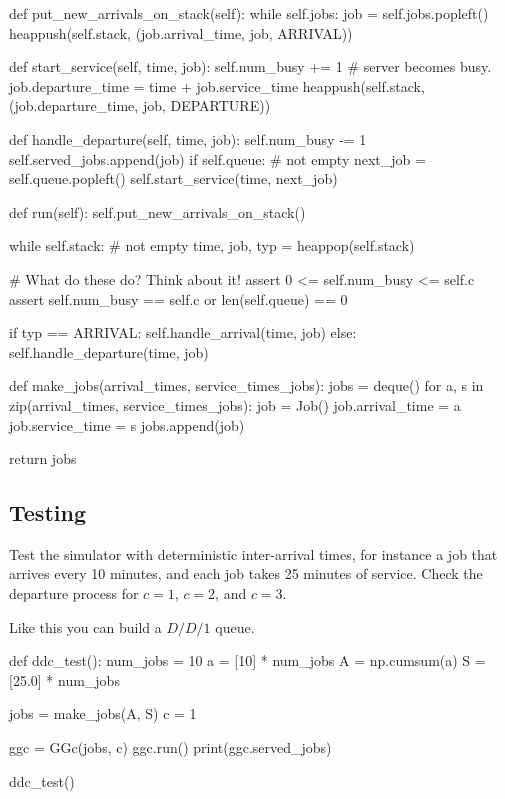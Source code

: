 \begin{exercise}
\begin{solution}
\begin{pyverbatim}
    def put_new_arrivals_on_stack(self):
        while self.jobs:
            job = self.jobs.popleft()
            heappush(self.stack, (job.arrival_time, job, ARRIVAL))

    def start_service(self, time, job):
        self.num_busy += 1  # server becomes busy.
        job.departure_time = time + job.service_time
        heappush(self.stack, (job.departure_time, job, DEPARTURE))

    def handle_departure(self, time, job):
        self.num_busy -= 1
        self.served_jobs.append(job)
        if self.queue:  # not empty
            next_job = self.queue.popleft()
            self.start_service(time, next_job)

    def run(self):
        self.put_new_arrivals_on_stack()

        while self.stack:  # not empty
            time, job, typ = heappop(self.stack)

            # What do these do? Think about it!
            assert 0 <= self.num_busy <= self.c
            assert self.num_busy == self.c or len(self.queue) == 0

            if typ == ARRIVAL:
                self.handle_arrival(time, job)
            else:
                self.handle_departure(time, job)


def make_jobs(arrival_times, service_times_jobs):
    jobs = deque()
    for a, s in zip(arrival_times, service_times_jobs):
        job = Job()
        job.arrival_time = a
        job.service_time = s
        jobs.append(job)

    return jobs
\end{pyverbatim}
\end{solution}
\end{exercise}


\subsection{Testing}
\label{sec:testing-1}

\begin{exercise}
Test the simulator with deterministic inter-arrival times, for instance a job that arrives every 10 minutes, and each job takes 25 minutes of service. Check the departure process for $c=1$, $c=2$, and $c=3$. 
\begin{solution}
Like this you can build a $D/D/1$ queue.
\begin{pyverbatim}
def ddc_test():
    num_jobs = 10
    a = [10] * num_jobs
    A = np.cumsum(a)
    S = [25.0] * num_jobs

    jobs = make_jobs(A, S)
    c = 1

    ggc = GGc(jobs, c)
    ggc.run()
    print(ggc.served_jobs)


ddc_test()
\end{pyverbatim}
\end{solution}

\end{exercise}

